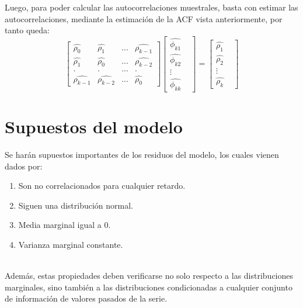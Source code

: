 \documentclass{report}
\begin{document}
Luego, para poder calcular las autocorrelaciones muestrales, basta con estimar las autocorrelaciones, mediante la estimación de la ACF vista anteriormente, por tanto queda:\\
\begin{equation}
\begin{bmatrix}
\hat{\rho_{0}} & \hat{\rho_{1}} & ... & \hat{\rho_{k-1}}\\
\hat{\rho_{1}} & \hat{\rho_{0}} & ... & \hat{\rho_{k-2}}\\
. & . & ... & . \\
\hat{\rho_{k-1}} & \hat{\rho_{k-2}} & ... & \hat{\rho_{0}}
\end{bmatrix}
\begin{bmatrix}
\hat{\phi_{k1}} \\
 \hat{\phi_{k2}}\\
\vdots &  \\
\hat{\phi_{kk}}
\end{bmatrix}=
\begin{bmatrix}
\hat{\rho_{1}} \\
 \hat{\rho_{2}}\\
\vdots &  \\
\hat{\rho_{k}}
\end{bmatrix}
\end{equation}

\section{Supuestos del modelo}
Se harán supuestos importantes de los residuos del modelo, los cuales vienen dados por:\\

 \begin{enumerate}
        \item Son no correlacionados para cualquier retardo. 
        \item Siguen una distribución normal. 
        \item Media marginal igual a 0.
        \item Varianza marginal constante. 
    \end{enumerate}\\ 
    \vspace{1cm}
    Además, estas propiedades deben verificarse no solo respecto a las distribuciones marginales, sino también a las distribuciones condicionadas a cualquier conjunto de
información de valores pasados de la serie.\\
\end{document}
